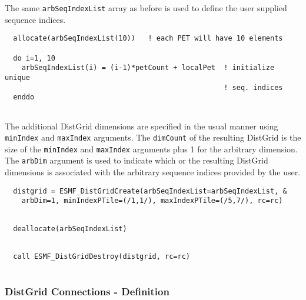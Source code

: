    The same {\tt arbSeqIndexList} array as before is used to define the 
   user supplied sequence indices. 

 \begin{verbatim}
  allocate(arbSeqIndexList(10))   ! each PET will have 10 elements
  
  do i=1, 10
    arbSeqIndexList(i) = (i-1)*petCount + localPet  ! initialize unique 
                                                    ! seq. indices
  enddo
 
\end{verbatim}
 

   The additional DistGrid dimensions are specified in the usual manner using
   {\tt minIndex} and {\tt maxIndex} arguments. The {\tt dimCount} of the
   resulting DistGrid is the size of the {\tt minIndex} and {\tt maxIndex}
   arguments plus 1 for the arbitrary dimension. The {\tt arbDim} argument is
   used to indicate which or the resulting DistGrid dimensions
   is associated with the arbitrary sequence indices provided by the user. 

 \begin{verbatim}
  distgrid = ESMF_DistGridCreate(arbSeqIndexList=arbSeqIndexList, &
    arbDim=1, minIndexPTile=(/1,1/), maxIndexPTile=(/5,7/), rc=rc)
 
\end{verbatim}
 

 \begin{verbatim}
  deallocate(arbSeqIndexList)
 
\end{verbatim}
 

 \begin{verbatim}
  call ESMF_DistGridDestroy(distgrid, rc=rc)
 
\end{verbatim}
 

   \subsubsection{DistGrid Connections - Definition}
   
